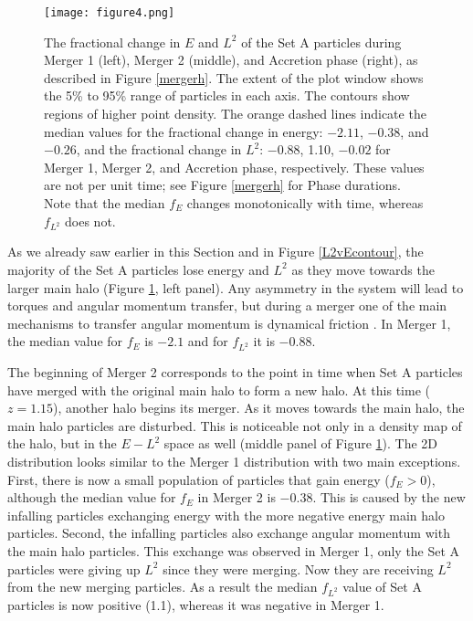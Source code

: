 \documentclass[a4paper,11pt]{article}
\begin{document}
\begin{figure}
\centering
\texttt{[image: figure4.png]}
\caption{The fractional change in $E$ and $L^2$ of the Set A particles during Merger 1 (left), Merger 2 (middle), and Accretion phase (right), as described in Figure \ref{mergerh}.  The 
extent of the plot window shows the 5\% to 95\% range of particles in each axis.  The contours show regions of higher point density.  The orange dashed lines 
indicate the median values for the fractional change in energy: $-2.11$, $-0.38$, and $-0.26$, and the fractional change in $L^2$: $-0.88$, 1.10, $-0.02$ for Merger 1, 
Merger 2, and Accretion phase, respectively.  These values are not per unit time; see Figure \ref{mergerh} for Phase durations.  Note that the median $f_E$ changes monotonically with time, whereas $f_{L^2}$ does not.}
\label{dEL2}
\end{figure}

As we already saw earlier in this Section and in Figure \ref{L2vEcontour}, the majority of the Set A particles lose energy and $L^2$ as they move towards 
the larger main halo (Figure \ref{dEL2}, left panel).  Any asymmetry in the system will lead to torques and angular momentum transfer, but during a merger 
one of the main mechanisms to transfer angular momentum is dynamical friction \citep{Cha43,Bin87}.  In Merger 1, the median value for $f_E$ is $-2.1$ and 
for $f_{L^2}$ it is $-0.88$.  

The beginning of Merger 2 corresponds to the point in time when Set A particles have merged with the original main 
halo to form a new halo. At this time ($z=1.15$), another halo begins its merger. As it moves towards the main halo, the main 
halo particles are disturbed.  This is noticeable not only in a density map of the halo, but in the $E-L^2$ space as well (middle panel of Figure \ref{dEL2}).  The 2D distribution looks similar to the Merger 1 
distribution with two main exceptions.  First, there is now a small population of particles that gain energy ($f_E>0$), although the median value for 
$f_E$ in Merger 2 is $-0.38$.  This is caused by the new infalling particles exchanging 
energy with the more negative energy main halo particles.  Second, the infalling particles also exchange angular momentum with the main halo particles.  This 
exchange was observed in Merger 1, only the Set A particles were giving up $L^2$ since they were merging.  Now they are receiving $L^2$ from the new merging 
particles.  As a result the median $f_{L^2}$ value of Set A particles is now positive (1.1), whereas it was negative in Merger 1. 
\end{document}
